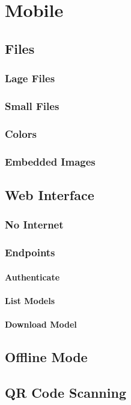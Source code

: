 
\section{Mobile}

    \subsection{Files}
    
        \subsubsection{Lage Files}
    
        \subsubsection{Small Files}
        
        \subsubsection{Colors}

        \subsubsection{Embedded Images}
        
    \subsection{Web Interface}

        \subsubsection{No Internet}

        \subsubsection{Endpoints}

            \paragraph{Authenticate}

            \paragraph{List Models}

            \paragraph{Download Model}
        
    \subsection{Offline Mode}

    \subsection{QR Code Scanning}
